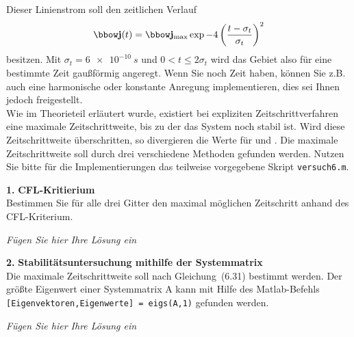\documentclass[Protokollheft.tex]{subfiles}
\begin{document}
\noindent Dieser Linienstrom soll den zeitlichen Verlauf
\begin{align}
    \jfit(t) = \jfit_{\text{max}} \exp{-4\left(\frac{t-\sigma_t}{\sigma_t}\right)^2}
\end{align}
besitzen. Mit $\sigma_t=\SI{6e-10}{s}$ und $0 < t\leq 2 \sigma_t$ wird das Gebiet also für eine bestimmte Zeit gaußförmig angeregt. Wenn Sie noch Zeit haben, können Sie z.B. auch eine harmonische oder konstante Anregung implementieren, dies sei Ihnen jedoch freigestellt.\\
\noindent
Wie im Theorieteil erläutert wurde, existiert bei expliziten Zeitschrittverfahren eine maximale Zeitschrittweite, bis zu
der das System noch stabil ist. Wird diese Zeitschrittweite
überschritten, so divergieren die Werte für {\efit} und {\hfit}. Die maximale
Zeitschrittweite soll durch drei verschiedene Methoden gefunden werden. Nutzen Sie bitte für die Implementierungen das teilweise vorgegebene Skript \lstinline{versuch6.m}.

\begin{framed}
	\noindent \textbf{1.} \textbf{CFL-Kritierium}\\
Bestimmen Sie für alle drei Gitter den maximal möglichen Zeitschritt anhand des CFL-Kriterium.\label{exer:calcDeltaTmaxWithCFL}
\end{framed}

\emph{Fügen Sie hier Ihre Lösung ein}

\begin{framed}
	\noindent \textbf{2.} \textbf{Stabilitätsuntersuchung mithilfe der Systemmatrix}\\
Die maximale Zeitschrittweite soll nach Gleichung~(6.31) bestimmt werden.
Der größte Eigenwert einer Systemmatrix A kann mit Hilfe
des Matlab-Befehls\\
\lstinline{[Eigenvektoren,Eigenwerte] = eigs(A,1)} gefunden werden.\label{exer:calcDeltaTmaxWithEV}
\end{framed}

\emph{Fügen Sie hier Ihre Lösung ein}
\end{document}
